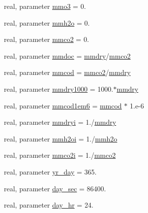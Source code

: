 \begin{DoxyCompactItemize}
real, parameter \hyperlink{namespaceconsts__coms_a3d2db28ffe653e18e24973962ee92eb1}{mmo3} = 0.
\item 
real, parameter \hyperlink{namespaceconsts__coms_a613dd19deda61e084a0a1c445c059339}{mmh2o} = 0.
\item 
real, parameter \hyperlink{namespaceconsts__coms_ac39e12891c7cedb24326a132e7288337}{mmco2} = 0.
\item 
real, parameter \hyperlink{namespaceconsts__coms_a59bb453864e15b4a294a2569058fca9d}{mmdoc} = \hyperlink{namespaceconsts__coms_a7aa35c23be3fddc9db2686245d45cda1}{mmdry}/\hyperlink{namespaceconsts__coms_ac39e12891c7cedb24326a132e7288337}{mmco2}
\item 
real, parameter \hyperlink{namespaceconsts__coms_a35f71d51e4282f3fc1150564317c3a97}{mmcod} = \hyperlink{namespaceconsts__coms_ac39e12891c7cedb24326a132e7288337}{mmco2}/\hyperlink{namespaceconsts__coms_a7aa35c23be3fddc9db2686245d45cda1}{mmdry}
\item 
real, parameter \hyperlink{namespaceconsts__coms_a17fe564075e4435419515e05d8a82022}{mmdry1000} = 1000.$\ast$\hyperlink{namespaceconsts__coms_a7aa35c23be3fddc9db2686245d45cda1}{mmdry}
\item 
real, parameter \hyperlink{namespaceconsts__coms_a25939fc53475af3a61a853e5adf1940c}{mmcod1em6} = \hyperlink{namespaceconsts__coms_a35f71d51e4282f3fc1150564317c3a97}{mmcod} $\ast$ 1.e-\/6
\item 
real, parameter \hyperlink{namespaceconsts__coms_a3a3fc200d63c11c0ae055b6b513fd309}{mmdryi} = 1./\hyperlink{namespaceconsts__coms_a7aa35c23be3fddc9db2686245d45cda1}{mmdry}
\item 
real, parameter \hyperlink{namespaceconsts__coms_ac580048533c43cb8473dcf3b620c9502}{mmh2oi} = 1./\hyperlink{namespaceconsts__coms_a613dd19deda61e084a0a1c445c059339}{mmh2o}
\item 
real, parameter \hyperlink{namespaceconsts__coms_a2df5d20d56bdc29d0d392c9ec513752a}{mmco2i} = 1./\hyperlink{namespaceconsts__coms_ac39e12891c7cedb24326a132e7288337}{mmco2}
\item 
real, parameter \hyperlink{namespaceconsts__coms_adad953349aafb445de8a82640081a357}{yr\+\_\+day} = 365.
\item 
real, parameter \hyperlink{namespaceconsts__coms_a3ff38434ac06e17e92b1929696b56611}{day\+\_\+sec} = 86400.
\item 
real, parameter \hyperlink{namespaceconsts__coms_a9cac2538090fb8cf04aaeaf9b1f92466}{day\+\_\+hr} = 24.
\item 

\end{DoxyCompactItemize}
